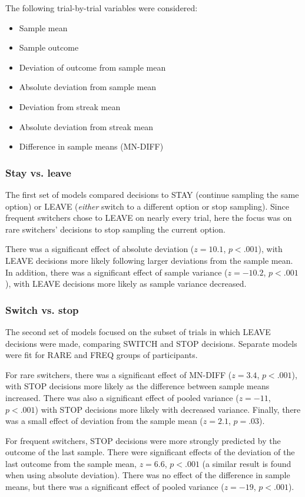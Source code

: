 \documentclass[english,doc]{apa}
\begin{document}
The following trial-by-trial variables were considered:

\begin{itemize}
\item Sample mean
\item Sample outcome
\item Deviation of outcome from sample mean
\item Absolute deviation from sample mean
\item Deviation from streak mean
\item Absolute deviation from streak mean
\item Difference in sample means (MN-DIFF)
\end{itemize}


\subsubsection{Stay vs. leave}

The first set of models compared decisions to STAY (continue sampling the same option) or LEAVE (\emph{either} switch to a different option or stop sampling). 
Since frequent switchers chose to LEAVE on nearly every trial, here the focus was on rare switchers' decisions to stop sampling the current option.

There was a significant effect of absolute deviation ($z=10.1$, $p < .001$), with LEAVE decisions more likely following larger deviations from the sample mean.
In addition, there was a significant effect of sample variance ($z=-10.2$, $p<.001$), with LEAVE decisions more likely as sample variance decreased.


\subsubsection{Switch vs. stop}

The second set of models focused on the subset of trials in which LEAVE decisions were made, comparing SWITCH and STOP decisions.
Separate models were fit for RARE and FREQ groups of participants.

For rare switchers, there was a significant effect of MN-DIFF ($z=3.4$, $p<.001$), with STOP decisions more likely as the difference between sample means increased.
There was also a significant effect of pooled variance ($z=-11$, $p<.001$) with STOP decisions more likely with decreased variance.
Finally, there was a small effect of deviation from the sample mean ($z=2.1$, $p=.03$).

For frequent switchers, STOP decisions were more strongly predicted by the outcome of the last sample.
There were significant effects of the deviation of the last outcome from the sample mean, $z=6.6$, $p<.001$ (a similar result is found when using absolute deviation).
There was no effect of the difference in sample means, but there was a significant effect of pooled variance ($z=-19$, $p<.001$).
\end{document}
